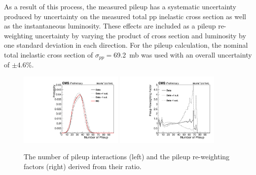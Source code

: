 As a result of this process, the measured pileup has a systematic uncertainty produced by uncertainty on the measured total pp inelastic cross section as well as the instantaneous luminosity. 
These effects are included as a pileup re-weighting uncertainty by varying the product of cross section and luminosity by one standard deviation in each direction.
For the pileup calculation, the nominal total inelastic cross section of $\sigma_{pp}=$\SI{69.2}{\milli\barn} was used with an overall uncertainty of $\pm4.6\%$\cite{pileupCx}.

\begin{figure}[ht]
	\centering
	\includegraphics[width=0.45\textwidth]{figures/PileupDists.pdf}
	\hspace{0.01\textwidth}
	\includegraphics[width=0.45\textwidth]{figures/PileupRatioDists.pdf}
        \caption[Pileup Re-weighting Histograms]{The number of pileup interactions (left) and the pileup re-weighting factors (right) derived from their ratio.}
        \label{fig:pileup}
\end{figure}

